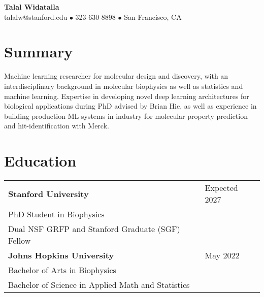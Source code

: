 \documentclass[11pt, a4paper]{article}
\begin{document}
\begin{center}
{\Large\bfseries Talal Widatalla}\\[0.3em]
{\small talalw@stanford.edu $\bullet$ 323-630-8898 $\bullet$ San Francisco, CA}
\end{center}
\vspace{0.5em}

\section{Summary}
Machine learning researcher for molecular design and discovery, with an interdisciplinary background in molecular biophysics as well as statistics and machine learning. Expertise in developing novel deep learning architectures for biological applications during PhD advised by Brian Hie, as well as experience in building production ML systems in industry for molecular property prediction and hit-identification with Merck.

\section{Education}
\noindent\begin{tabular}{@{}p{\dimexpr\textwidth-1.25in}p{1.25in}@{}}
\textbf{Stanford University} & Expected 2027\\
PhD Student in Biophysics & \\
Dual NSF GRFP and Stanford Graduate (SGF) Fellow & \\[0.5em]
\textbf{Johns Hopkins University} & May 2022\\
Bachelor of Arts in Biophysics & \\
Bachelor of Science in Applied Math and Statistics & \\
\end{tabular}
\end{document}
